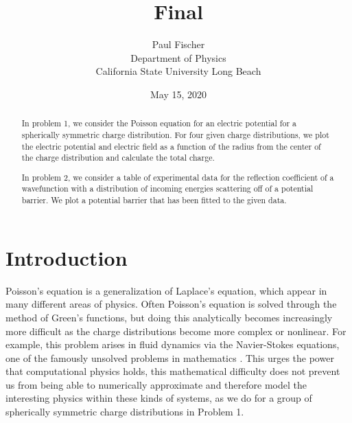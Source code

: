 \documentclass[12pt]{article}
\begin{document}


\title{Final}
\author{Paul Fischer \\
Department of Physics\\
California State University Long Beach}
\date{May 15, 2020}

\maketitle

\begin{abstract}

In problem 1, we consider the Poisson equation for an electric potential for a spherically symmetric charge distribution.  For four given charge distributions, we plot the electric potential and electric field as a function of the radius from the center of the charge distribution and calculate the total charge.

In problem 2, we consider a table of experimental data for the reflection coefficient of a wavefunction with a distribution of incoming energies scattering off of a potential barrier.  We plot a potential barrier that has been fitted to the given data.

\end{abstract}

\section{Introduction}

Poisson's equation is a generalization of Laplace's equation, which appear in many different areas of physics.  Often Poisson's equation is solved through the method of Green's functions, but doing this analytically becomes increasingly more difficult as the charge distributions become more complex or nonlinear.  For example, this problem arises in fluid dynamics via the Navier-Stokes equations, one of the famously unsolved problems in mathematics \cite{poisson}.  This urges the power that computational physics holds, this mathematical difficulty does not prevent us from being able to numerically approximate and therefore model the interesting physics within these kinds of systems, as we do for a group of spherically symmetric charge distributions in Problem 1.
\end{document}
